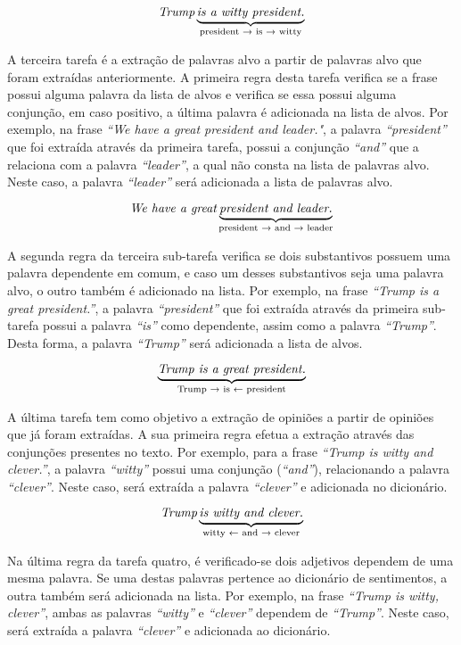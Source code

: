\[\textit{Trump} \underbrace{\textit{is a witty president.}}_\text{president
\textrightarrow \text{ is} \textrightarrow \text{ witty}}\]

A terceira tarefa é a extração de palavras alvo a partir de palavras alvo que
foram extraídas anteriormente. A primeira regra desta tarefa verifica se a frase
possui alguma palavra da lista de alvos e verifica se essa possui alguma
conjunção, em caso positivo, a última palavra é adicionada na lista
de alvos. Por exemplo, na frase \textit{``We have a great president and
leader."}, a palavra \textit{``president''} que foi extraída através
da primeira tarefa, possui a conjunção \textit{``and''} que a relaciona com a
palavra \textit{``leader''}, a qual não consta na lista de palavras alvo. Neste
caso, a palavra \textit{``leader''} será adicionada a lista de palavras alvo.


\[\textit{We have a great} \underbrace{\textit{president and
leader.}}_\text{president \textrightarrow \text{ and} \textrightarrow \text{
leader}}\]

A segunda regra da terceira sub-tarefa verifica se dois substantivos
possuem uma palavra dependente em comum, e caso um desses substantivos seja
uma palavra alvo, o outro também é adicionado na lista. Por exemplo, na frase
\textit{``Trump is a great president.''}, a palavra \textit{``president''} que
foi extraída através da primeira sub-tarefa possui a palavra \textit{``is''} como dependente, assim como a
palavra \textit{``Trump''}. Desta forma, a palavra \textit{``Trump''} será
adicionada a lista de alvos.

\[\underbrace{\textit{Trump is a great president.}}_\text{Trump
\textrightarrow \text{ is} \textleftarrow \text{ president}}\]



A última tarefa tem como objetivo a extração de opiniões a partir de
opiniões que já foram extraídas. A sua primeira regra efetua a extração através
das conjunções presentes no texto. Por exemplo, para a frase \textit{``Trump is
witty and clever.''}, a palavra \textit{``witty''} possui uma conjunção
(\textit{``and''}), relacionando a palavra \textit{``clever''}. Neste caso, será
extraída a palavra \textit{``clever''} e adicionada no dicionário.

\[\textit{Trump} \underbrace{\textit{is witty and clever.}}_\text{witty
\textleftarrow \text{ and} \textrightarrow \text{ clever}}\]


Na última regra da tarefa quatro, é verificado-se dois adjetivos
dependem de uma mesma palavra. Se uma destas palavras pertence ao dicionário de
sentimentos, a outra também será adicionada na lista. Por exemplo, na frase
\textit{``Trump is witty, clever''}, ambas as palavras \textit{``witty''} e
\textit{``clever''} dependem de \textit{``Trump''}. Neste caso, será extraída a
palavra \textit{``clever''} e adicionada ao dicionário.

